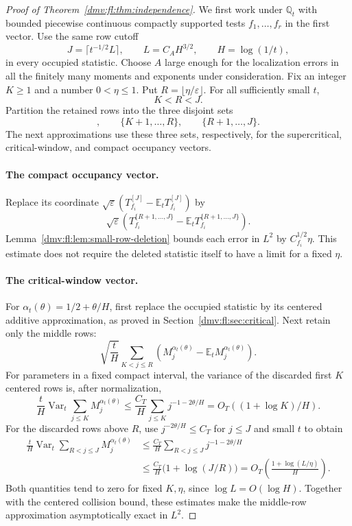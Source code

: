 \documentclass[11pt,letterpaper]{article}
\numberwithin{equation}{section}
\theoremstyle{definition}\newtheorem{definition}[theorem]{Definition}
\theoremstyle{remark}\newtheorem{remark}[theorem]{Remark}
\newcommand{\E}{\mathbb E}
\newcommand{\Q}{\mathbb Q}
\newcommand{\eps}{\varepsilon}
\DeclareMathOperator{\Var}{Var}
\begin{document}
\begin{proof}[Proof of Theorem~\ref{dmv:fl:thm:independence}]
We first work under $\Q_t$ with bounded piecewise continuous
compactly supported tests $f_1,\ldots,f_r$ in the first vector.
Use the same row cutoff
\[
 J=\lceil t^{-1/2}L\rceil,\qquad
 L=C_AH^{3/2},\qquad H=\log(1/t),
\]
in every occupied statistic. Choose $A$ large enough for the
localization errors in all the finitely many moments and exponents
under consideration. Fix an integer $K\ge1$ and a number
$0<\eta\le1$. Put $R=\lfloor\eta/\eps\rfloor$.
For all sufficiently small $t$,
\[
             K<R<J.
\]
Partition the retained rows into the three disjoint sets
\begin{equation}
 [K],\qquad \{K+1,\ldots,R\},\qquad\{R+1,\ldots,J\}.
 \label{dmv:fl:eq:three-row-blocks}
\end{equation}
The next approximations use these three sets, respectively, for
the supercritical, critical-window, and compact occupancy vectors.

\paragraph{The compact occupancy vector.}
Replace its coordinate
$\sqrt\eps(T_{f_i}^{[J]}-\E_tT_{f_i}^{[J]})$ by
\[
 \sqrt\eps\left(T_{f_i}^{\{R+1,\ldots,J\}}
                    -\E_tT_{f_i}^{\{R+1,\ldots,J\}}\right).
\]
Lemma~\ref{dmv:fl:lem:small-row-deletion} bounds each error in $L^2$ by
$C_{f_i}^{1/2}\eta$. This estimate does not require the deleted
statistic itself to have a limit for a fixed $\eta$.

\paragraph{The critical-window vector.}
For $\alpha_t(\theta)=1/2+\theta/H$, first replace the occupied
statistic by its centered additive approximation, as proved in
Section~\ref{dmv:fl:sec:critical}. Next retain only the middle rows:
\[
 \sqrt{\frac tH}
 \sum_{K<j\le R}
       \left(M_j^{\alpha_t(\theta)}
                        -\E_tM_j^{\alpha_t(\theta)}\right).
\]
For parameters in a fixed compact interval, the variance of the
discarded first $K$ centered rows is, after normalization,
\begin{equation}
 \frac tH
 \Var_t\sum_{j\le K}M_j^{\alpha_t(\theta)}
 \le
 \frac{C_T}{H}\sum_{j\le K}j^{-1-2\theta/H}
 =O_T((1+\log K)/H).
 \label{dmv:fl:eq:window-small-block}
\end{equation}
For the discarded rows above $R$, use
$j^{-2\theta/H}\le C_T$ for $j\le J$ and small $t$ to obtain
\begin{align}
 \frac tH
 \Var_t\sum_{R<j\le J}M_j^{\alpha_t(\theta)}
 &\le\frac{C_T}{H}\sum_{R<j\le J}j^{-1-2\theta/H}
 \nonumber\\
 &\le\frac{C_T}{H}\bigl(1+\log(J/R)\bigr)
 =O_T\!\left(\frac{1+\log(L/\eta)}H\right).
 \label{dmv:fl:eq:window-large-block}
\end{align}
Both quantities tend to zero for fixed $K,\eta$, since
$\log L=O(\log H)$. Together with the centered collision bound,
these estimates make the middle-row approximation asymptotically
exact in $L^2$.


\end{proof}
\end{document}
